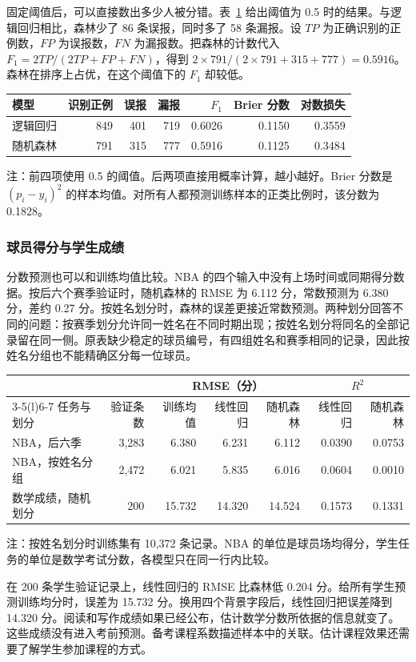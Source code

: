 \documentclass[12pt,journal,onecolumn,a4paper]{IEEEtran}
\newcommand{\tabnote}[1]{\par\vspace{2pt}\begin{minipage}{\linewidth}\footnotesize #1\end{minipage}}
\newcommand{\inlinetab}[1]{\begin{table}[H]\centering\small #1\end{table}}
\begin{document}
固定阈值后，可以直接数出多少人被分错。表~\ref{tab:adult} 给出阈值为 0.5 时的结果。与逻辑回归相比，森林少了 86 条误报，同时多了 58 条漏报。设 $TP$ 为正确识别的正例数，$FP$ 为误报数，$FN$ 为漏报数。把森林的计数代入 $F_1=2TP/(2TP+FP+FN)$，得到 $2\times791/(2\times791+315+777)=0.5916$。森林在排序上占优，在这个阈值下的 $F_1$ 却较低。
\inlinetab{\label{tab:adult}
\begin{tabular}{@{}lrrrrrr@{}}\toprule
模型 & 识别正例 & 误报 & 漏报 & $F_1$ & Brier 分数 & 对数损失\\\midrule
逻辑回归 & 849 & 401 & 719 & 0.6026 & 0.1150 & 0.3559\\
随机森林 & 791 & 315 & 777 & 0.5916 & 0.1125 & 0.3484\\\bottomrule\end{tabular}
\tabnote{注：前四项使用 0.5 的阈值。后两项直接用概率计算，越小越好。Brier 分数是 $(p_i-y_i)^2$ 的样本均值。对所有人都预测训练样本的正类比例时，该分数为 0.1828。}}
\FloatBarrier
\subsubsection{球员得分与学生成绩}
分数预测也可以和训练均值比较。NBA 的四个输入中没有上场时间或同期得分数据。按后六个赛季验证时，随机森林的 RMSE 为 6.112 分，常数预测为 6.380 分，差约 0.27 分。按姓名划分时，森林的误差更接近常数预测。两种划分回答不同的问题：按赛季划分允许同一姓名在不同时期出现；按姓名划分将同名的全部记录留在同一侧。原表缺少稳定的球员编号，有四组姓名和赛季相同的记录，因此按姓名分组也不能精确区分每一位球员。
\inlinetab{\label{tab:scores}
\begin{tabular}{@{}lrrrrrr@{}}\toprule
 & & \multicolumn{3}{c}{RMSE（分）} & \multicolumn{2}{c}{$R^2$}\\\cmidrule(lr){3-5}\cmidrule(l){6-7}
任务与划分 & 验证条数 & 训练均值 & 线性回归 & 随机森林 & 线性回归 & 随机森林\\\midrule
NBA，后六季 & 3,283 & 6.380 & 6.231 & 6.112 & 0.0390 & 0.0753\\
NBA，按姓名分组 & 2,472 & 6.021 & 5.835 & 6.016 & 0.0604 & 0.0010\\
数学成绩，随机划分 & 200 & 15.732 & 14.320 & 14.524 & 0.1573 & 0.1331\\\bottomrule\end{tabular}
\tabnote{注：按姓名划分时训练集有 10,372 条记录。NBA 的单位是球员场均得分，学生任务的单位是数学考试分数，各模型只在同一行内比较。}}

在 200 条学生验证记录上，线性回归的 RMSE 比森林低 0.204 分。给所有学生预测训练均分时，误差为 15.732 分。换用四个背景字段后，线性回归把误差降到 14.320 分。阅读和写作成绩如果已经公布，估计数学分数所依据的信息就变了。这些成绩没有进入考前预测。备考课程系数描述样本中的关联。估计课程效果还需要了解学生参加课程的方式。
\end{document}
